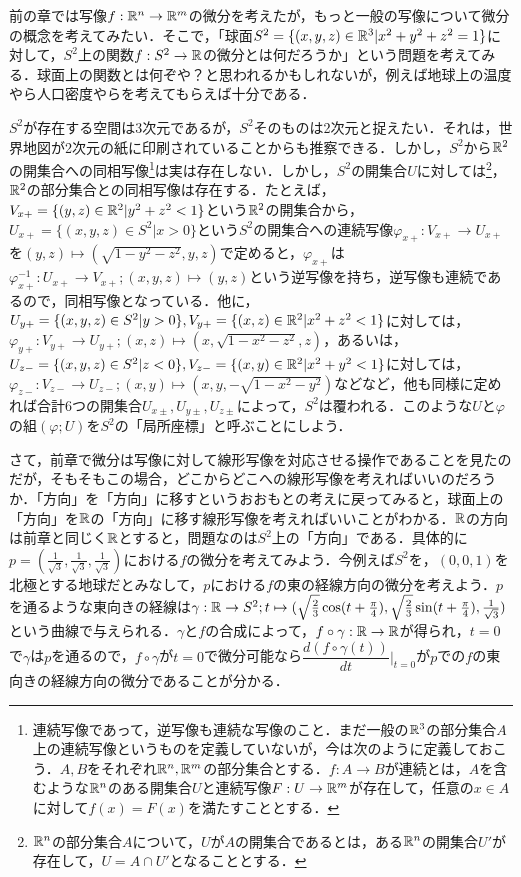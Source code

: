前の章では写像$f:{\mathbb R}^n\rightarrow{\mathbb R}^m$の微分を考えたが，もっと一般の写像について微分の概念を考えてみたい．そこで，「球面$S^2=\{(x,y,z)\in{\mathbb R}^3|x^2+y^2+z^2=1\}$に対して，$S^2$上の関数$f:S^2\rightarrow{\mathbb R}$の微分とは何だろうか」という問題を考えてみる．球面上の関数とは何ぞや？と思われるかもしれないが，例えば地球上の温度やら人口密度やらを考えてもらえば十分である．


$S^2$が存在する空間は3次元であるが，$S^2$そのものは2次元と捉えたい．それは，世界地図が2次元の紙に印刷されていることからも推察できる．しかし，$S^2$から${\mathbb R}^2$の開集合への同相写像\footnote{連続写像であって，逆写像も連続な写像のこと．まだ一般の${\mathbb R}^3$の部分集合$A$上の連続写像というものを定義していないが，今は次のように定義しておこう．$A,B$をそれぞれ${\mathbb R}^n,{\mathbb R}^m$の部分集合とする．$f:A\rightarrow B$が連続とは，$A$を含むような${\mathbb R}^n$のある開集合$U$と連続写像$F:U\rightarrow {\mathbb R}^m$が存在して，任意の$x\in A$に対して$f(x)=F(x)$を満たすこととする．}は実は存在しない．しかし，$S^2$の開集合$U$に対しては\footnote{${\mathbb R}^n$の部分集合$A$について，$U$が$A$の開集合であるとは，ある${\mathbb R}^n$の開集合$U'$が存在して，$U=A\cap U'$となることとする．}，${\mathbb R}^2$の部分集合との同相写像は存在する．たとえば，$V_{x+}=\{(y,z)\in {\mathbb R}^2|y^2+z^2<1\}$という${\mathbb R}^2$の開集合から，$U_{x+}=\{(x,y,z)\in S^2|x>0\}$という$S^2$の開集合への連続写像$\varphi_{x+}:V_{x+}\rightarrow U_{x+}$を$(y,z)\mapsto (\sqrt{1-y^2-z^2},y,z)$で定めると，$\varphi_{x+}$は$\varphi_{x+}^{-1}:U_{x+}\rightarrow V_{x+};(x,y,z)\mapsto (y,z)$という逆写像を持ち，逆写像も連続であるので，同相写像となっている．他に，$U_{y+}=\{(x,y,z)\in S^2|y>0\},V_{y+}=\{(x,z)\in{\mathbb R}^2|x^2+z^2<1\}$に対しては，$\varphi_{y+}:V_{y+}\rightarrow U_{y+};(x,z)\mapsto (x,\sqrt{1-x^2-z^2},z)$，あるいは，$U_{z-}=\{(x,y,z)\in S^2|z<0\},V_{z-}=\{(x,y)\in{\mathbb R}^2|x^2+y^2<1\}$に対しては，$\varphi_{z-}:V_{z-}\rightarrow U_{z-};(x,y)\mapsto (x,y,-\sqrt{1-x^2-y^2})$などなど，他も同様に定めれば合計$6$つの開集合$U_{x\pm},U_{y\pm},U_{z\pm}$によって，$S^2$は覆われる．このような$U$と$\varphi$の組$(\varphi;U)$を$S^2$の「局所座標」と呼ぶことにしよう．


さて，前章で微分は写像に対して線形写像を対応させる操作であることを見たのだが，そもそもこの場合，どこからどこへの線形写像を考えればいいのだろうか．「方向」を「方向」に移すというおおもとの考えに戻ってみると，球面上の「方向」を${\mathbb R}$の「方向」に移す線形写像を考えればいいことがわかる．${\mathbb R}$の方向は前章と同じく${\mathbb R}$とすると，問題なのは$S^2$上の「方向」である．具体的に$p=(\frac{1}{\sqrt{3}},\frac{1}{\sqrt{3}},\frac{1}{\sqrt{3}})$における$f$の微分を考えてみよう．今例えば$S^2$を，$(0,0,1)$を北極とする地球だとみなして，$p$における$f$の東の経線方向の微分を考えよう．$p$を通るような東向きの経線は$\gamma:{\mathbb R}\rightarrow S^2;t\mapsto(\sqrt{\frac{2}{3}}\cos(t+\frac{\pi}{4}),\sqrt{\frac{2}{3}}\sin(t+\frac{\pi}{4}),\frac{1}{\sqrt{3}})$という曲線で与えられる．$\gamma$と$f$の合成によって，$f\circ \gamma:{\mathbb R}\rightarrow{\mathbb R}$が得られ，$t=0$で$\gamma$は$p$を通るので，$f\circ\gamma$が$t=0$で微分可能なら$\dfrac{d(f\circ\gamma(t))}{dt}\Big|_{t=0}$が$p$での$f$の東向きの経線方向の微分であることが分かる．


